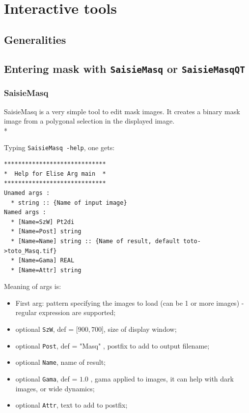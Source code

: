 \chapter{Interactive tools}

\section{Generalities}


\section{Entering mask with {\tt SaisieMasq} or {\tt SaisieMasqQT} }

\subsection{SaisieMasq}

SaisieMasq is a very simple tool to edit mask images.
It creates a binary mask image from a polygonal selection in the displayed image.\\*

Typing {\tt SaisieMasq -help}, one gets:

\begin{verbatim}
*****************************
*  Help for Elise Arg main  *
*****************************
Unamed args :
  * string :: {Name of input image}
Named args :
  * [Name=SzW] Pt2di
  * [Name=Post] string
  * [Name=Name] string :: {Name of result, default toto->toto_Masq.tif}
  * [Name=Gama] REAL
  * [Name=Attr] string
\end{verbatim}

Meaning of args is:

\begin{itemize}
   \item First arg: pattern specifying the images to load (can be 1 or more images) - regular expression are supported;
   \item optional {\tt SzW}, def = [$900,700$], size of display window;
   \item optional {\tt Post}, def = "Masq" , postfix to add to output filename;
   \item optional {\tt Name}, name of result;
   \item optional {\tt Gama}, def = $1.0$ , gama applied to images, it can help with dark images, or wide dynamics;
   \item optional {\tt Attr}, text to add to postfix;
\end{itemize}


